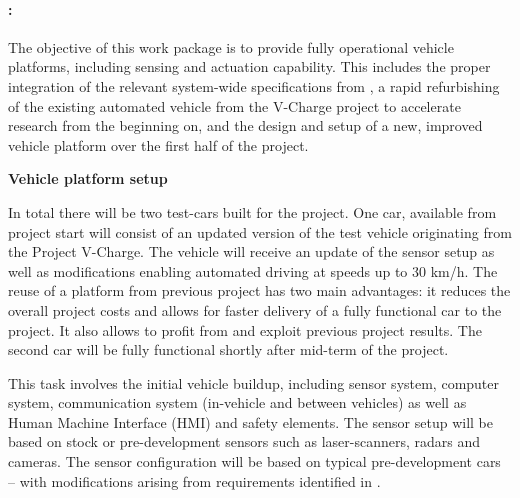
\paragraph{\WPVehicle: \WPVehicleTitle \\}

{\noindent\wptablefont
\label{wp1}
\label{wp2}

\wptableheaderB{\WPVehicleVW}{\WPVehicleETHZ}{\WPVehicleIBM}{\WPVehicleCLUJ}{\WPVehiclePRAGUE}


The objective of this work package is to provide fully operational vehicle platforms, including sensing and actuation capability. This includes the proper integration of the relevant system-wide specifications from \WPSpecification, a rapid refurbishing of the existing automated vehicle from the V-Charge project to accelerate research from the beginning on, and the design and setup of a new, improved vehicle platform over the first half of the project.

\begin{tasks}{\WPVehicleNo}

\item  {\bf Vehicle platform setup}

In total there will be two test-cars built for the project. One car, available from project start will consist of an updated version of the test vehicle originating from the Project V-Charge. The vehicle will receive an update of the sensor setup as well as modifications enabling automated driving at speeds up to 30 km/h. The reuse of a platform from previous project has two main advantages: it reduces the overall project costs and allows for faster delivery of a fully functional car to the project. It also allows to profit from and exploit previous project results. The second car will be fully functional shortly after mid-term of the project.

This task involves the initial vehicle buildup, including sensor system, computer system, communication system (in-vehicle and between vehicles) as well as Human Machine Interface (HMI) and safety elements. The sensor setup will be based on stock or pre-development sensors such as laser-scanners, radars and cameras. The sensor configuration will be based on typical pre-development cars -- with modifications arising from requirements identified in \WPSpecification.


\end{tasks}}

